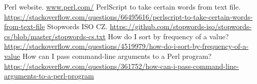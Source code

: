 \documentclass[a4paper,11pt]{article}
\begin{document}
    \vspace{10pt}
    \renewcommand{\refname}{Odkazy}
    \begin{thebibliography}{9}
            Perl website. \url{www.perl.com/}
            PerlScript to take certain words from text file. \url{https://stackoverflow.com/questions/66495616/perlscript-to-take-certain-words-from-text-file}
            Stopwords ISO CZ. \url{https://github.com/stopwords-iso/stopwords-cs/blob/master/stopwords-cs.txt}
            How do I sort by frequency of a value? \url{https://stackoverflow.com/questions/4519979/how-do-i-sort-by-frequency-of-a-value}
            How can I pass command-line arguments to a Perl program? \url{https://stackoverflow.com/questions/361752/how-can-i-pass-command-line-arguments-to-a-perl-program}
    \end{thebibliography}
\end{document}
